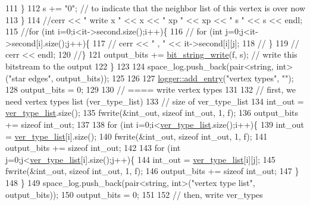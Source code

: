\begin{DoxyCode}
111       \}
112       s += \textcolor{stringliteral}{"0"}; \textcolor{comment}{// to indicate that the neighbor list of this vertex is over now}
113     \}
114     \textcolor{comment}{//cerr << " write  x " << x << " xp " << xp << " s " << s << endl;}
115     \textcolor{comment}{//for (int i=0;i<it->second.size();i++)\{}
116     \textcolor{comment}{//  for (int j=0;j<it->second[i].size();j++)\{}
117     \textcolor{comment}{//    cerr << " , " << it->second[i][j];}
118     \textcolor{comment}{//  \}}
119     \textcolor{comment}{//  cerr << endl;}
120     \textcolor{comment}{//\}}
121     output\_bits += \hyperlink{compression__helper_8cpp_a9a2fbdf1fe0e38f631e7e242a819883b}{bit\_string\_write}(f, s); \textcolor{comment}{// write this bitstream to the output}
122   \}
123 
124   space\_log.push\_back(pair<string, int> (\textcolor{stringliteral}{"star edges"}, output\_bits));
125 
126 
127   \hyperlink{classlogger_a710163deb17bc81f70d53d285b8ac9ac}{logger::add\_entry}(\textcolor{stringliteral}{"vertex types"}, \textcolor{stringliteral}{""});
128   output\_bits = 0;
129 
130   \textcolor{comment}{// ==== write vertex types}
131 
132   \textcolor{comment}{// first, we need vertex types list (ver\_type\_list)}
133   \textcolor{comment}{// size of ver\_type\_list}
134   int\_out = \hyperlink{classmarked__graph__compressed_af2e3e55223d436628a02758dfae88493}{ver\_type\_list}.size();
135   fwrite(&int\_out, \textcolor{keyword}{sizeof} int\_out, 1, f);
136   output\_bits += \textcolor{keyword}{sizeof} int\_out;
137 
138   \textcolor{keywordflow}{for} (\textcolor{keywordtype}{int} i=0;i<\hyperlink{classmarked__graph__compressed_af2e3e55223d436628a02758dfae88493}{ver\_type\_list}.size();i++)\{
139     int\_out = \hyperlink{classmarked__graph__compressed_af2e3e55223d436628a02758dfae88493}{ver\_type\_list}[i].size();
140     fwrite(&int\_out, \textcolor{keyword}{sizeof} int\_out, 1, f);
141     output\_bits += \textcolor{keyword}{sizeof} int\_out;
142 
143     \textcolor{keywordflow}{for} (\textcolor{keywordtype}{int} j=0;j<\hyperlink{classmarked__graph__compressed_af2e3e55223d436628a02758dfae88493}{ver\_type\_list}[i].size();j++)\{
144       int\_out = \hyperlink{classmarked__graph__compressed_af2e3e55223d436628a02758dfae88493}{ver\_type\_list}[i][j];
145       fwrite(&int\_out, \textcolor{keyword}{sizeof} int\_out, 1, f);
146       output\_bits += \textcolor{keyword}{sizeof} int\_out;
147     \}
148   \}
149   space\_log.push\_back(pair<string, int>(\textcolor{stringliteral}{"vertex type list"}, output\_bits));
150   output\_bits = 0;
151   
152   \textcolor{comment}{// then, write ver\_types}

\end{DoxyCode}
